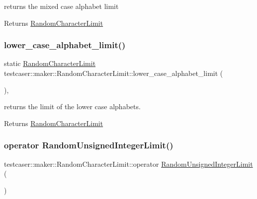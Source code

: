 returns the mixed case alphabet limit 

\begin{DoxyReturn}{Returns}
\mbox{\hyperlink{classtestcaser_1_1maker_1_1RandomCharacterLimit}{Random\+Character\+Limit}} 
\end{DoxyReturn}
\mbox{\label{classtestcaser_1_1maker_1_1RandomCharacterLimit_ae6e40c00b9225a88b0133c17d4b24f90}} 
\subsubsection{\texorpdfstring{lower\_case\_alphabet\_limit()}{lower\_case\_alphabet\_limit()}}
{\footnotesize\ttfamily static \mbox{\hyperlink{classtestcaser_1_1maker_1_1RandomCharacterLimit}{Random\+Character\+Limit}} testcaser\+::maker\+::\+Random\+Character\+Limit\+::lower\+\_\+case\+\_\+alphabet\+\_\+limit (\begin{DoxyParamCaption}{ }\end{DoxyParamCaption})\hspace{0.3cm}{\ttfamily [inline]}, {\ttfamily [static]}}



returns the limit of the lower case alphabets. 

\begin{DoxyReturn}{Returns}
\mbox{\hyperlink{classtestcaser_1_1maker_1_1RandomCharacterLimit}{Random\+Character\+Limit}} 
\end{DoxyReturn}
\mbox{\label{classtestcaser_1_1maker_1_1RandomCharacterLimit_a230a33b5d028fdef4a027f7c96663d32}} 
\subsubsection{\texorpdfstring{operator RandomUnsignedIntegerLimit()}{operator RandomUnsignedIntegerLimit()}}
{\footnotesize\ttfamily testcaser\+::maker\+::\+Random\+Character\+Limit\+::operator \mbox{\hyperlink{classtestcaser_1_1maker_1_1RandomUnsignedIntegerLimit}{Random\+Unsigned\+Integer\+Limit}} (\begin{DoxyParamCaption}{ }\end{DoxyParamCaption})\hspace{0.3cm}{\ttfamily [inline]}}



